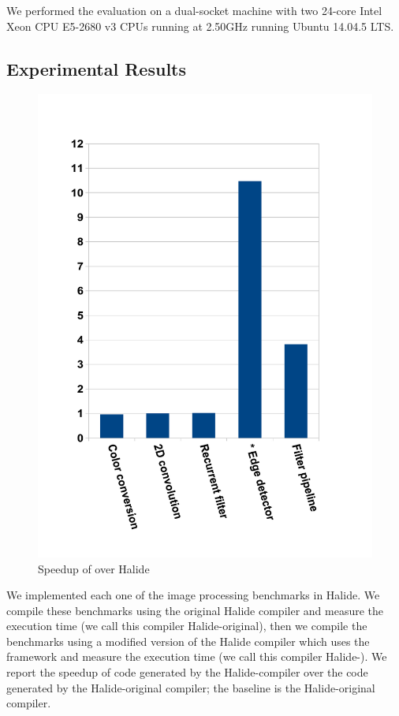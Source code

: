We performed the evaluation on a dual-socket machine with two 24-core Intel Xeon CPU E5-2680 v3 CPUs running at 2.50GHz running Ubuntu 14.04.5 LTS.

\subsection{Experimental Results}

\begin{figure}
\centering
 \includegraphics[scale=0.5]{./figures/perf.pdf}
 \caption{Speedup of \framework over Halide}
 \label{fig:speedup}
\end{figure}

We implemented each one of the image processing benchmarks in Halide.  We compile these benchmarks using the original Halide compiler and measure the execution time (we call this compiler Halide-original), then we compile the benchmarks using a modified version of the Halide compiler which uses the \framework framework and measure the execution time (we call this compiler Halide-\framework).  We report the speedup of code generated by the Halide-\framework compiler over the code generated by the Halide-original compiler; the baseline is the Halide-original compiler.

